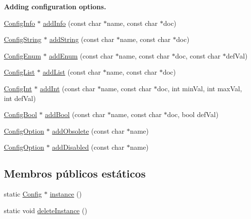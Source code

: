 \begin{Indent}{\bf Adding configuration options.}\par
\begin{DoxyCompactItemize}
\item 
\hyperlink{class_config_info}{Config\-Info} $\ast$ \hyperlink{class_config_adad7d76c6e3e07109796a5ffb9f2c6e4}{add\-Info} (const char $\ast$name, const char $\ast$doc)
\item 
\hyperlink{class_config_string}{Config\-String} $\ast$ \hyperlink{class_config_a74b8275821f367fd0c588ccc223d8696}{add\-String} (const char $\ast$name, const char $\ast$doc)
\item 
\hyperlink{class_config_enum}{Config\-Enum} $\ast$ \hyperlink{class_config_ab3913dcc45810d5073e967a99fe0c2a4}{add\-Enum} (const char $\ast$name, const char $\ast$doc, const char $\ast$def\-Val)
\item 
\hyperlink{class_config_list}{Config\-List} $\ast$ \hyperlink{class_config_a9566fc8a9d1560eb4181b7e245f6ce96}{add\-List} (const char $\ast$name, const char $\ast$doc)
\item 
\hyperlink{class_config_int}{Config\-Int} $\ast$ \hyperlink{class_config_abb7be086fa3130874a722a5a9c30b308}{add\-Int} (const char $\ast$name, const char $\ast$doc, int min\-Val, int max\-Val, int def\-Val)
\item 
\hyperlink{class_config_bool}{Config\-Bool} $\ast$ \hyperlink{class_config_aa80cc6d1590c228000e21e7c0682f5b9}{add\-Bool} (const char $\ast$name, const char $\ast$doc, bool def\-Val)
\item 
\hyperlink{class_config_option}{Config\-Option} $\ast$ \hyperlink{class_config_aeef352ac0af92d9f5df0074aa74d0884}{add\-Obsolete} (const char $\ast$name)
\item 
\hyperlink{class_config_option}{Config\-Option} $\ast$ \hyperlink{class_config_a42614c703f049d415636dd0346ec0314}{add\-Disabled} (const char $\ast$name)
\end{DoxyCompactItemize}
\end{Indent}
\subsection*{Membros públicos estáticos}
\begin{DoxyCompactItemize}
\item 
static \hyperlink{class_config}{Config} $\ast$ \hyperlink{class_config_aa6def1c3b3abfdaa0df22df0b558c94d}{instance} ()
\item 
static void \hyperlink{class_config_a5946f8823f24f5bd2b1749d912ea8ba7}{delete\-Instance} ()
\end{DoxyCompactItemize}


